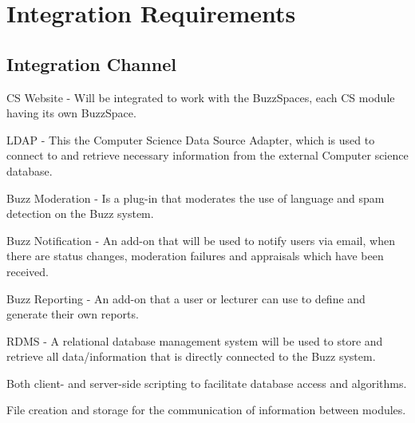 \documentclass[a4paper,12pt]{report}
\begin{document}
%	
	
	

\section{Integration Requirements}
\subsection{Integration Channel}
\begin{description}
\item CS Website - Will be integrated to work with the BuzzSpaces, each CS module having its own BuzzSpace.
\item LDAP - This the Computer Science Data Source Adapter, which is used to connect to and retrieve necessary information from the external Computer science database. 
\item Buzz Moderation - Is a plug-in that moderates the use of language and spam detection on the Buzz system.
\item Buzz Notification - An add-on that will be used to notify users via email, when there are status changes,
	moderation failures and appraisals which have been received.
\item Buzz Reporting - An add-on that a user or lecturer can use to define and generate their own reports.
\item RDMS - A relational database management system will be used to store and retrieve all data/information that is directly connected to the Buzz system. 
\item Both client- and server-side scripting to facilitate database access and algorithms.
\item File creation and storage for the communication of information between modules.
\end{description}
\end{document}
